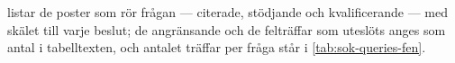  listar de poster som rör frågan --- citerade,
stödjande och kvalificerande --- med skälet till varje beslut; de
angränsande och de felträffar som uteslöts anges som antal i
tabelltexten, och antalet träffar per fråga står i
\cref{tab:sok-queries-fen}.
